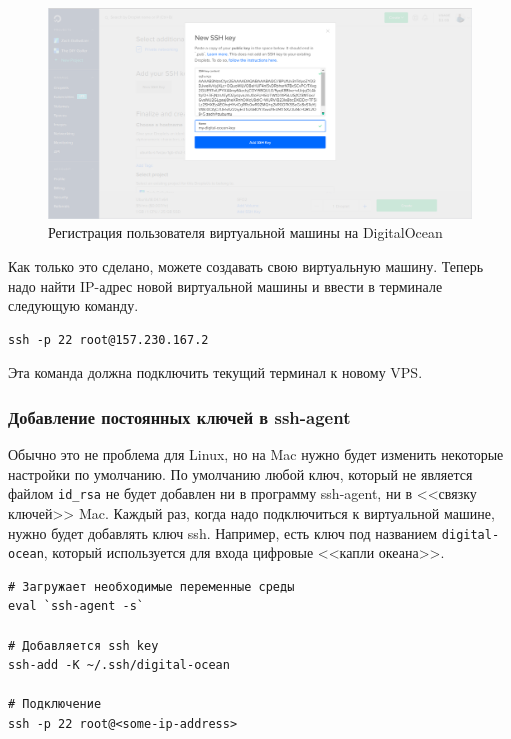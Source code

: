 \documentclass[12pt]{article}
\begin{document}
\begin{figure}[tbh]
  \centering
  \includegraphics[width=0.9\linewidth]{blog/2019/bash-essentials/digital-ocean-key.png}

  \caption{Регистрация пользователя виртуальной машины на DigitalOcean}
  \label{fig:userreg}
\end{figure}
Как только это сделано, можете создавать свою виртуальную машину. Теперь
надо найти IP-адрес новой виртуальной машины и ввести в терминале
следующую команду.

\begin{verbatim}
ssh -p 22 root@157.230.167.2
\end{verbatim}

Эта команда должна подключить текущий терминал к новому VPS.

\hypertarget{Permanently-Add-Keys-to-ssh-agent}{%
\subsubsection{\texorpdfstring{\protect\hyperlink{Permanently-Add-Keys-to-ssh-agent}{}Добавление
постоянных ключей в
ssh-agent}{Добавление постоянных ключей в ssh-agent}}\label{Permanently-Add-Keys-to-ssh-agent}}

Обычно это не проблема для Linux, но на Mac нужно будет изменить
некоторые настройки по умолчанию. По умолчанию любой ключ, который не
является файлом \texttt{id\_rsa} не будет добавлен ни в программу
ssh-agent, ни в <<связку ключей>> Mac. Каждый раз, когда надо подключиться
к виртуальной машине, нужно будет добавлять ключ ssh. Например, есть
ключ под названием \texttt{digital-ocean}, который используется для
входа цифровые <<капли океана>>.

\begin{verbatim}
# Загружает необходимые переменные среды
eval `ssh-agent -s`

# Добавляется ssh key
ssh-add -K ~/.ssh/digital-ocean

# Подключение
ssh -p 22 root@<some-ip-address>
\end{verbatim}
\end{document}
